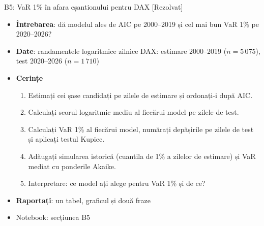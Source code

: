 \begin{frame}{B5: VaR 1\% în afara eșantionului pentru DAX [Rezolvat]}
\itemsize{\scriptsize}
\begin{itemize}
\item \textbf{Întrebarea}: dă modelul ales de AIC pe 2000--2019 și cel mai bun VaR 1\% pe 2020--2026?
\item \textbf{Date}: randamentele logaritmice zilnice DAX: estimare 2000--2019 ($n = 5\,075$), test 2020--2026 ($n = 1\,710$)
\item \textbf{Cerințe}
\begin{enumerate}
    \item Estimați cei șase candidați pe zilele de estimare și ordonați-i după AIC.
    \item Calculați scorul logaritmic mediu al fiecărui model pe zilele de test.
    \item Calculați VaR 1\% al fiecărui model, numărați depășirile pe zilele de test și aplicați testul Kupiec.
    \item Adăugați simularea istorică (cuantila de 1\% a zilelor de estimare) și VaR mediat cu ponderile Akaike.
    \item Interpretare: ce model ați alege pentru VaR 1\% și de ce?
\end{enumerate}
\item \textbf{Raportați}: un tabel, graficul și două fraze
\item Notebook: secțiunea B5
\end{itemize}
\end{frame}

